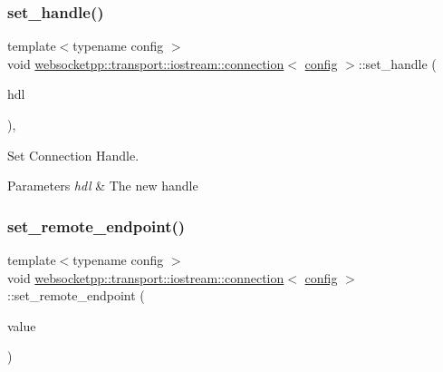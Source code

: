 \subsubsection{\texorpdfstring{set\+\_\+handle()}{set\_handle()}}
{\footnotesize\ttfamily template$<$typename config $>$ \\
void \mbox{\hyperlink{classwebsocketpp_1_1transport_1_1iostream_1_1connection}{websocketpp\+::transport\+::iostream\+::connection}}$<$ \mbox{\hyperlink{classconfig}{config}} $>$\+::set\+\_\+handle (\begin{DoxyParamCaption}\item[{\mbox{\hyperlink{namespacewebsocketpp_a6b3d26a10ee7229b84b776786332631d}{connection\+\_\+hdl}}}]{hdl }\end{DoxyParamCaption})\hspace{0.3cm}{\ttfamily [inline]}, {\ttfamily [protected]}}



Set Connection Handle. 


\begin{DoxyParams}{Parameters}
{\em hdl} & The new handle \\
\hline
\end{DoxyParams}
\mbox{\label{classwebsocketpp_1_1transport_1_1iostream_1_1connection_a846340a41ebbce1a6a1cecfd9026c2e9}} 
\subsubsection{\texorpdfstring{set\+\_\+remote\+\_\+endpoint()}{set\_remote\_endpoint()}}
{\footnotesize\ttfamily template$<$typename config $>$ \\
void \mbox{\hyperlink{classwebsocketpp_1_1transport_1_1iostream_1_1connection}{websocketpp\+::transport\+::iostream\+::connection}}$<$ \mbox{\hyperlink{classconfig}{config}} $>$\+::set\+\_\+remote\+\_\+endpoint (\begin{DoxyParamCaption}\item[{std\+::string}]{value }\end{DoxyParamCaption})\hspace{0.3cm}{\ttfamily [inline]}}



